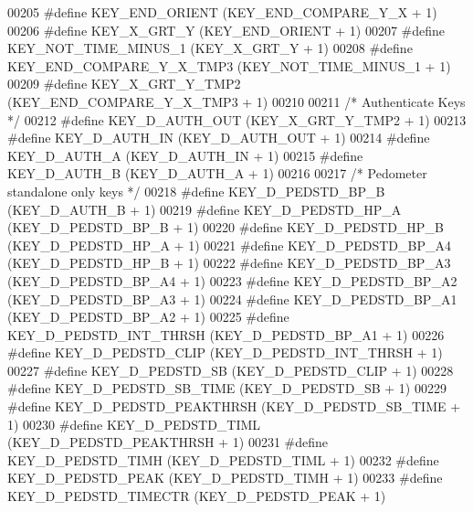 \begin{DoxyCode}
00205 \textcolor{preprocessor}{#define KEY\_END\_ORIENT              (KEY\_END\_COMPARE\_Y\_X + 1)}
00206 \textcolor{preprocessor}{#define KEY\_X\_GRT\_Y                 (KEY\_END\_ORIENT + 1)}
00207 \textcolor{preprocessor}{#define KEY\_NOT\_TIME\_MINUS\_1        (KEY\_X\_GRT\_Y + 1)       }
00208 \textcolor{preprocessor}{#define KEY\_END\_COMPARE\_Y\_X\_TMP3    (KEY\_NOT\_TIME\_MINUS\_1 + 1) }
00209 \textcolor{preprocessor}{#define KEY\_X\_GRT\_Y\_TMP2            (KEY\_END\_COMPARE\_Y\_X\_TMP3 + 1)}
00210 
00211 \textcolor{comment}{/* Authenticate Keys */}
00212 \textcolor{preprocessor}{#define KEY\_D\_AUTH\_OUT              (KEY\_X\_GRT\_Y\_TMP2 + 1)}
00213 \textcolor{preprocessor}{#define KEY\_D\_AUTH\_IN               (KEY\_D\_AUTH\_OUT + 1)}
00214 \textcolor{preprocessor}{#define KEY\_D\_AUTH\_A                (KEY\_D\_AUTH\_IN + 1)}
00215 \textcolor{preprocessor}{#define KEY\_D\_AUTH\_B                (KEY\_D\_AUTH\_A + 1)}
00216 
00217 \textcolor{comment}{/* Pedometer standalone only keys */}
00218 \textcolor{preprocessor}{#define KEY\_D\_PEDSTD\_BP\_B           (KEY\_D\_AUTH\_B + 1)}
00219 \textcolor{preprocessor}{#define KEY\_D\_PEDSTD\_HP\_A           (KEY\_D\_PEDSTD\_BP\_B + 1)}
00220 \textcolor{preprocessor}{#define KEY\_D\_PEDSTD\_HP\_B           (KEY\_D\_PEDSTD\_HP\_A + 1)}
00221 \textcolor{preprocessor}{#define KEY\_D\_PEDSTD\_BP\_A4          (KEY\_D\_PEDSTD\_HP\_B + 1)}
00222 \textcolor{preprocessor}{#define KEY\_D\_PEDSTD\_BP\_A3          (KEY\_D\_PEDSTD\_BP\_A4 + 1)}
00223 \textcolor{preprocessor}{#define KEY\_D\_PEDSTD\_BP\_A2          (KEY\_D\_PEDSTD\_BP\_A3 + 1)}
00224 \textcolor{preprocessor}{#define KEY\_D\_PEDSTD\_BP\_A1          (KEY\_D\_PEDSTD\_BP\_A2 + 1)}
00225 \textcolor{preprocessor}{#define KEY\_D\_PEDSTD\_INT\_THRSH      (KEY\_D\_PEDSTD\_BP\_A1 + 1)}
00226 \textcolor{preprocessor}{#define KEY\_D\_PEDSTD\_CLIP           (KEY\_D\_PEDSTD\_INT\_THRSH + 1)}
00227 \textcolor{preprocessor}{#define KEY\_D\_PEDSTD\_SB             (KEY\_D\_PEDSTD\_CLIP + 1)}
00228 \textcolor{preprocessor}{#define KEY\_D\_PEDSTD\_SB\_TIME        (KEY\_D\_PEDSTD\_SB + 1)}
00229 \textcolor{preprocessor}{#define KEY\_D\_PEDSTD\_PEAKTHRSH      (KEY\_D\_PEDSTD\_SB\_TIME + 1)}
00230 \textcolor{preprocessor}{#define KEY\_D\_PEDSTD\_TIML           (KEY\_D\_PEDSTD\_PEAKTHRSH + 1)}
00231 \textcolor{preprocessor}{#define KEY\_D\_PEDSTD\_TIMH           (KEY\_D\_PEDSTD\_TIML + 1)}
00232 \textcolor{preprocessor}{#define KEY\_D\_PEDSTD\_PEAK           (KEY\_D\_PEDSTD\_TIMH + 1)}
00233 \textcolor{preprocessor}{#define KEY\_D\_PEDSTD\_TIMECTR        (KEY\_D\_PEDSTD\_PEAK + 1)}

\end{DoxyCode}
